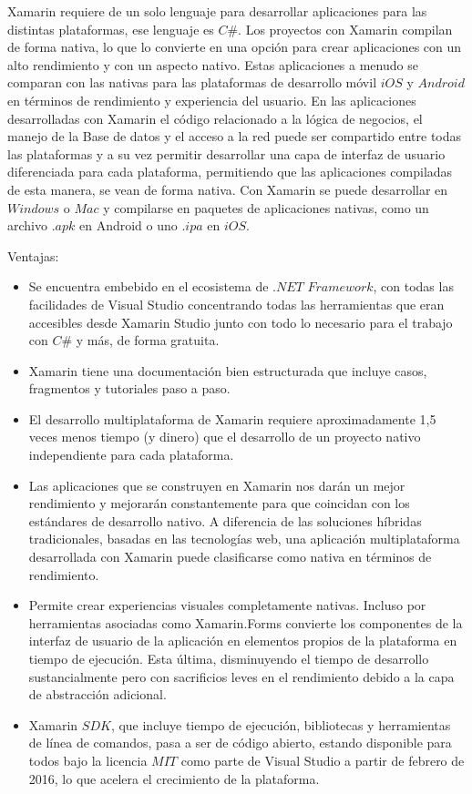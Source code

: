 Xamarin requiere de un solo lenguaje para desarrollar aplicaciones para las distintas plataformas, ese lenguaje es $C\#$. Los proyectos con Xamarin compilan de forma nativa, lo que lo convierte en una opción para crear aplicaciones con un alto rendimiento y con un aspecto nativo. Estas aplicaciones a menudo se comparan con las nativas para las plataformas de desarrollo móvil $iOS$ y $Android$ en términos de rendimiento y experiencia del usuario. En las aplicaciones desarrolladas con Xamarin el código relacionado a la lógica de negocios, el manejo de la Base de datos y el acceso a la red puede ser compartido entre todas las plataformas y a su vez permitir desarrollar una capa de interfaz de usuario diferenciada para cada plataforma, permitiendo que las aplicaciones compiladas de esta manera, se vean de forma nativa.
Con Xamarin se puede desarrollar en $Windows$ o $Mac$ y compilarse en paquetes de aplicaciones nativas, como un archivo $.apk$ en Android o uno $.ipa$ en $iOS$.

Ventajas:

\begin{itemize}


\item	Se encuentra embebido en el ecosistema de $.NET$ $Framework$, con todas las facilidades de Visual Studio concentrando todas las herramientas que eran accesibles desde Xamarin Studio junto con todo lo necesario para el trabajo con $C\#$ y más, de forma gratuita.
\item	Xamarin tiene una documentación bien estructurada que incluye casos, fragmentos y tutoriales paso a paso.
\item	El desarrollo multiplataforma de Xamarin requiere aproximadamente 1,5 veces menos tiempo (y dinero) que el desarrollo de un proyecto nativo independiente para cada plataforma.
\item	Las aplicaciones que se construyen en Xamarin nos darán un mejor rendimiento y mejorarán constantemente para que coincidan con los estándares de desarrollo nativo. A diferencia de las soluciones híbridas tradicionales, basadas en las tecnologías web, una aplicación multiplataforma desarrollada con Xamarin puede clasificarse como nativa en términos de rendimiento.
\item	Permite crear experiencias visuales completamente nativas. Incluso por herramientas asociadas como Xamarin.Forms convierte los componentes de la interfaz de usuario de la aplicación en elementos propios de la plataforma en tiempo de ejecución. Esta última, disminuyendo el tiempo de desarrollo sustancialmente pero con sacrificios leves en el rendimiento debido a la capa de abstracción adicional.
\item	Xamarin $SDK$, que incluye tiempo de ejecución, bibliotecas y herramientas de línea de comandos, pasa a ser de código abierto, estando disponible para todos bajo la licencia $MIT$  como parte de Visual Studio a partir de febrero de 2016, lo que acelera el crecimiento de la plataforma.

\end{itemize}


